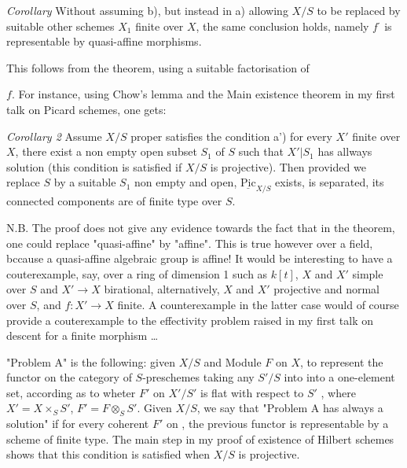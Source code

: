 \documentclass[11pt,a4paper]{article}
\begin{document}
\emph{Corollary} Without assuming b), but instead in a) allowing $X/S$ to be replaced by suitable other schemes $X_1$ finite over $X$, the same conclusion holds, namely $f^{\cdot}$ is representable by  quasi-affine morphisms.

This follows from the theorem, using a suitable factorisation of

$f$. For instance, using Chow's lemma and the Main existence theorem in my first talk on Picard schemes, one gets:

\emph{Corollary 2} Assume $X/S$ proper satisfies the condition  a') for every $X'$ finite over $X$, there exist a non empty open subset $S_1$ of $S$ such that  $X'|S_1$ has allways solution  (this condition is satisfied if $X/S$ is projective). Then  provided we replace $S$ by a suitable $S_1$ non empty and open, $\underline{\mathrm{Pic}}_{X/S}$ exists, is separated, its connected components are of finite type over $S$.

N.B. The proof does not give any evidence towards the fact that in the theorem, one could replace "quasi-affine" by "affine". This is true however over a field, bccause a quasi-affine algebraic group is affine! It would be interesting to have a couterexample, say, over a \struck{\ill{}} ring of dimension 1 such as $k[t]$, $X$ and $X'$  simple over $S$ and $X' \to X$ birational,  alternatively, \struck{\ill{}} $X$ and $X'$ projective and normal over $S$, and $f\colon X' \to X$ finite. A counterexample in the latter case would of course provide a couterexample to the effectivity problem raised in my first talk on descent for a finite morphism …

"Problem A" is the following: given $X/S$ and  Module $F$ on $X$, to represent the functor on the category of $S$-preschemes taking any $S'/S$ into  into a one-element  set, according as to wheter $F'$ on $X'/S'$ is flat with respect to $S'$ , where $X' = X \times_S S'$, $F' = F \otimes_S S'$. Given $X/S$, we say that "Problem A  has always a solution" if for every coherent $F'$ on  , the previous functor  is representable by a scheme of finite type. The main step in my proof of existence of Hilbert schemes shows that this condition is satisfied when $X/S$ is projective.
\end{document}
